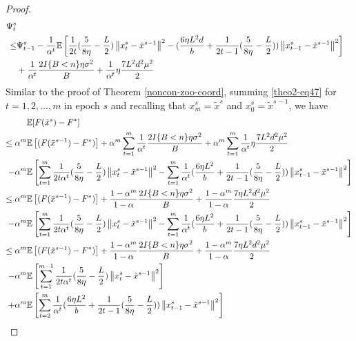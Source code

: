 \documentclass{article}
\newcommand*{\E}{\mathbb{E}}
\newcommand{\norm}[1]{\left\lVert#1\right\rVert}
\theoremstyle{definition}
\theoremstyle{remark}
\begin{document}
\begin{proof}
{\color{Brown}
\begin{align} 
\Psi_t^s \notag
\\ \leq& \Psi_{t-1}^s - \frac{1}{\alpha^t}\E\left[ \frac{1}{2t}(\frac{5}{8\eta} - \frac{L}{2})\norm{{x}_t^s-\tilde{x}^{s-1}}^2-(\frac{6\eta L^2 d}{b}+\frac{1}{2t-1}(\frac{5}{8\eta} - \frac{L}{2}))\norm{x_{t-1}^s-\tilde{x}^{s-1}}^2\right]\notag\\
&+ \frac{1}{\alpha^t}\frac{2I\{B < n\}\eta \sigma ^2}{B}+\frac{1}{\alpha^t}\eta \frac{7 L^2 d^2 \mu^2}{2}\label{theo2-eq47}
 \end{align}
 }
Similar to the proof of Theorem \ref{noncon-zoo-coord}, summing \eqref{theo2-eq47} for $t=1, 2, \ldots, m$ in epoch $s$ and recalling that $x_m^s = \tilde{x}^s$ and $x_0^s = \tilde{x}^{s-1}$, we have 
{\color{Brown}
\begin{align}
\E&[F(\tilde{x}^s)-F^*]\notag\\
\leq\alpha^m\E&\left[(F(\tilde{x}^{s-1}) - F^*)\right] +\alpha^m\sum_{t=1}^m \frac{1}{\alpha^t}\frac{2I\{B < n\}\eta \sigma ^2}{B}+\alpha^m\sum_{t=1}^m \frac{1}{\alpha^t}\eta \frac{7 L^2 d^2 \mu^2}{2}\notag
\\-\alpha^m\E&\left[\sum_{t=1}^m\frac{1}{2t\alpha^t}(\frac{5}{8\eta} - \frac{L}{2})\norm{{x}_t^s-\tilde{x}^{s-1}}^2-\sum_{t=1}^m\frac{1}{\alpha^t}(\frac{6 \eta L^2 }{b}+\frac{1}{2t-1}(\frac{5}{8\eta} - \frac{L}{2})) \norm{x_{t-1}^s-\tilde{x}^{s-1}}^2 \right]\notag\\
\leq\alpha^m\E&\left[(F(\tilde{x}^{s-1}) - F^*)\right] + \frac{1-\alpha^m}{1-\alpha}\frac{2I\{B < n\}\eta \sigma ^2}{B}+\frac{1-\alpha^m}{1-\alpha} \frac{7 \eta L^2 d^2 \mu^2}{2}\notag
\\-\alpha^m\E&\left[\sum_{t=1}^m\frac{1}{2t\alpha^t}(\frac{5}{8\eta} - \frac{L}{2})\norm{{x}_t^s-\tilde{x}^{s-1}}^2-\sum_{t=1}^m\frac{1}{\alpha^t}(\frac{6\eta L^2 }{b}+\frac{1}{2t-1}(\frac{5}{8\eta} - \frac{L}{2})) \norm{x_{t-1}^s-\tilde{x}^{s-1}}^2 \right]\notag\\
\leq\alpha^m\E&\left[(F(\tilde{x}^{s-1}) - F^*)\right] + \frac{1-\alpha^m}{1-\alpha}\frac{2I\{B < n\}\eta \sigma ^2}{B}+\frac{1-\alpha^m}{1-\alpha}\frac{7 \eta L^2 d^2 \mu^2}{2}\notag
\\-\alpha^m\E&\left[\sum_{t=1}^{m-1}\frac{1}{2t\alpha^t}(\frac{5}{8\eta} - \frac{L}{2})\norm{{x}_t^s-\tilde{x}^{s-1}}^2\right]\notag\\
+\alpha^m\E&\left[\sum_{t=2}^m\frac{1}{\alpha^t}(\frac{6\eta L^2}{b}+\frac{1}{2t-1}(\frac{5}{8\eta} - \frac{L}{2})) \norm{x_{t-1}^s-\tilde{x}^{s-1}}^2 \right]\label{eq48}\\

\end{align}}
\end{proof}
\end{document}
